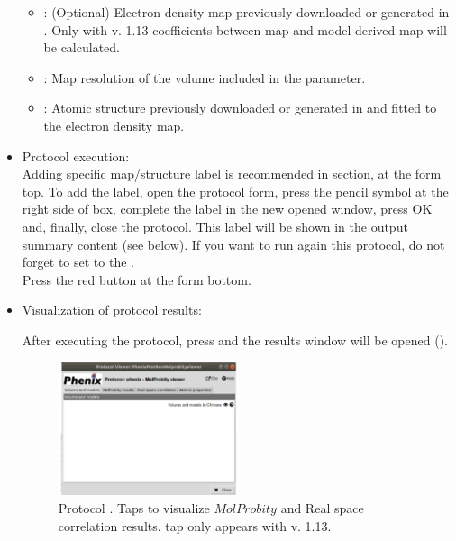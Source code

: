 \begin{itemize}
    \begin{itemize}
     \item {}: (Optional) Electron density map previously downloaded or generated in \scipion. Only with \phenix v. 1.13  coefficients between map and model-derived map will be calculated.
     \item {}: Map resolution of the volume included in the  parameter.
     \item {}: Atomic structure previously downloaded or generated in \scipion and fitted to the electron density map.
    \end{itemize}
    
 \item Protocol execution:\\
 Adding specific map/structure label is recommended in  section, at the form top. To add the label, open the protocol form, press the pencil symbol at the right side of  box, complete the label in the new opened window, press OK and, finally, close the protocol. This label will be shown in the output summary content (see below). If you want to run again this protocol, do not forget to set to  the .\\
  Press the  red button at the form bottom.
  
 \item Visualization of protocol results:
  
  After executing the protocol, press  and the results window will be opened (). 
  
  \begin{figure}[H]
     \centering 
     \captionsetup{width=.9\linewidth} 
     \includegraphics[width=0.50\textwidth]{Images_appendix/Fig144.pdf}
     \caption{Protocol . Taps to visualize $MolProbity$  and Real space correlation results.  tap only appears with \phenix v. 1.13.}
     \label{fig:app_protocol_molprobity_2}
    \end{figure}
    

\end{itemize}
